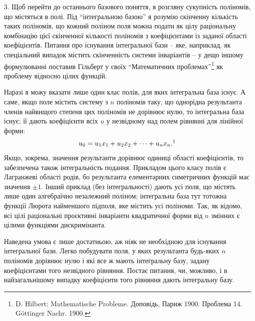\documentclass[11pt]{article}
\begin{document}
3. Щоб перейти до останнього базового поняття, я розгляну сукупність поліномів, що містяться в полі. Під ``інтегральною базою'' я розумію скінченну кількість таких поліномів, що кожний поліном поля можна подати як цілу раціональну комбінацію цієї скінченної кількості поліномів з коефіцієнтами із заданої області коефіцієнтів. Питання про існування інтегральної бази -- яке, наприклад, як спеціальний випадок містить скінченність системи інваріантів -- у дещо іншому формулюванні поставив Гільберт у своїх ``Математичних проблемах''\footnote{D. Hilbert: Mathematische Probleme. Доповідь, Париж 1900. Проблема 14. Göttinger Nachr. 1900.} як проблему відносно цілих функцій.

Наразі я можу вказати лише один клас полів, для яких інтегральна база існує. А саме, якщо поле містить систему з $n$ поліномів таку, що однорідна результанта членів найвищого степеня цих поліномів не дорівнює нулю, то інтегральна база існує; її дають коефіцієнти всіх $u$ у незвідному над полем рівнянні для лінійної форми:
\[
  u_0=u_1x_1+u_2x_2+\cdots+u_nx_n.\footnotemark
\]
Якщо, зокрема, значення результанти дорівнює одиниці області коефіцієнтів, то забезпечена також інтегральність подання. Прикладом цього класу полів є Лагранжеві області родів, бо результанта елементарних симетричних функцій має значення $\pm 1$. Інший приклад (без інтегральності) дають усі поля, що містять лише один алгебраїчно незалежний поліном; інтегральна база тут тотожна функції Люрота найменшого підполя, яке містить усі поліноми. Так, як відомо, всі цілі раціональні проєктивні інваріанти квадратичної форми від $n$ змінних є цілими функціями дискримінанта.

Наведена умова є лише достатньою, аж ніяк не необхідною для існування інтегральної бази. Легко побудувати поля, у яких результанта будь-яких $n$ поліномів дорівнює нулю і які все ж мають інтегральну базу, задану коефіцієнтами того незвідного рівняння. Постає питання, чи, можливо, і в найзагальнішому випадку коефіцієнти того рівняння дають інтегральну базу.
\end{document}
